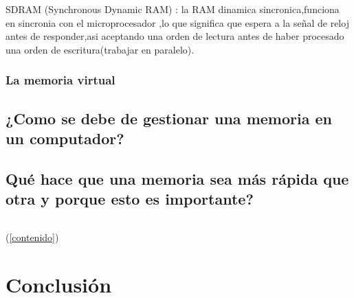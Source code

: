 \documentclass{article}
\begin{document}
            SDRAM (Synchronous Dynamic RAM) : la RAM dinamica sincronica,funciona en sincronia con el microprocesador ,lo que significa que espera a la señal de reloj antes de responder,asi aceptando una orden de lectura antes  de haber procesado una orden de escritura(trabajar en paralelo).\cite{hardzone}
            
        \subsubsection{La memoria virtual}
            
        
        
    \subsection{¿Como se debe de gestionar una memoria en un computador?}
    \subsection{Qué hace que una memoria sea más rápida que otra y porque esto es importante?}
    


\begin{lstlisting}

\end{lstlisting}

(\ref{contenido})

\section{Conclusión} \label{conclulsion}



\end{document}
